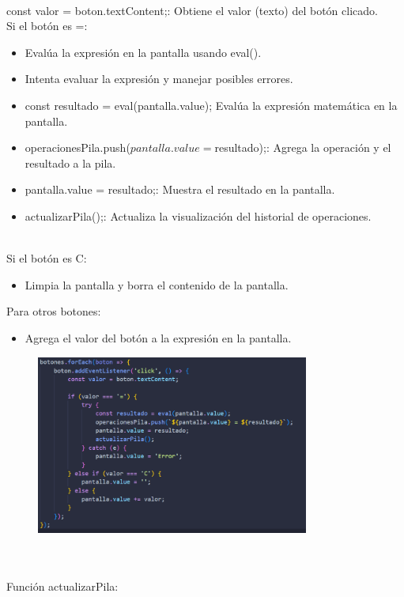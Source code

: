 \documentclass{article}
\begin{document}
\\const valor = boton.textContent;: Obtiene el valor (texto) del botón clicado.
\\Si el botón es =:
\begin{itemize}
    \item Evalúa la expresión en la pantalla usando eval().
    \item Intenta evaluar la expresión y manejar posibles errores.
    \item const resultado = eval(pantalla.value); Evalúa la expresión matemática en la pantalla.
    \item operacionesPila.push(${pantalla.value} = ${resultado});: Agrega la operación y el resultado a la pila.
    \item pantalla.value = resultado;: Muestra el resultado en la pantalla.
    \item actualizarPila();: Actualiza la visualización del historial de operaciones.
\end{itemize}
\\Si el botón es C:
\begin{itemize}
    \item Limpia la pantalla y borra el contenido de la pantalla.
\end{itemize}
Para otros botones:
\begin{itemize}
    \item Agrega el valor del botón a la expresión en la pantalla.
\end{itemize}
 \begin{figure}[H]
		          \centering
		          \includegraphics[width=0.8\textwidth,keepaspectratio]                       {img/botonesCal.png}
    \end{figure}  
\\
\\Función actualizarPila:
\end{document}
